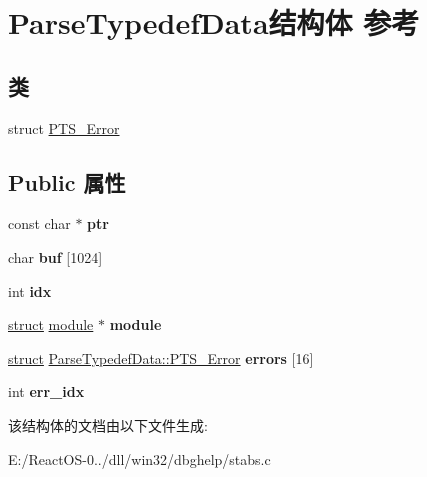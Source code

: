\hypertarget{struct_parse_typedef_data}{}\section{Parse\+Typedef\+Data结构体 参考}
\label{struct_parse_typedef_data}
\subsection*{类}
\begin{DoxyCompactItemize}
\item 
struct \hyperlink{struct_parse_typedef_data_1_1_p_t_s___error}{P\+T\+S\+\_\+\+Error}
\end{DoxyCompactItemize}
\subsection*{Public 属性}
\begin{DoxyCompactItemize}
\item 
\mbox{\label{struct_parse_typedef_data_a5a7f08280db71dc1f825fc633ee59927}} 
const char $\ast$ {\bfseries ptr}
\item 
\mbox{\label{struct_parse_typedef_data_a9ec52519020efaac4b2f20a7aac5c04d}} 
char {\bfseries buf} \mbox{[}1024\mbox{]}
\item 
\mbox{\label{struct_parse_typedef_data_a84990cb066b7e095866ed5120ca6e50f}} 
int {\bfseries idx}
\item 
\mbox{\label{struct_parse_typedef_data_a5c56b25aae11de93e0bee048f6b890cf}} 
\hyperlink{interfacestruct}{struct} \hyperlink{structmodule}{module} $\ast$ {\bfseries module}
\item 
\mbox{\label{struct_parse_typedef_data_a774c25953ab0090949b944530ba103ac}} 
\hyperlink{interfacestruct}{struct} \hyperlink{struct_parse_typedef_data_1_1_p_t_s___error}{Parse\+Typedef\+Data\+::\+P\+T\+S\+\_\+\+Error} {\bfseries errors} \mbox{[}16\mbox{]}
\item 
\mbox{\label{struct_parse_typedef_data_a96b9930536ce30b89c9ea44cc6f95484}} 
int {\bfseries err\+\_\+idx}
\end{DoxyCompactItemize}


该结构体的文档由以下文件生成\+:\begin{DoxyCompactItemize}
\item 
E\+:/\+React\+O\+S-\/0../dll/win32/dbghelp/stabs.\+c\end{DoxyCompactItemize}
